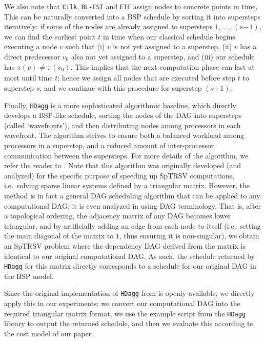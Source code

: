 \documentclass[sigconf,nonacm]{acmart}
\begin{document}
We also note that \texttt{Cilk}, \texttt{BL-EST} and \texttt{ETF} assign nodes to concrete points in time. This can be naturally converted into a BSP schedule by sorting it into supersteps iteratively: if some of the nodes are already assigned to supersteps $1$, ..., $(s_{\!}-_{\!}1)$, we can find the earliest point $t$ in time when our classical schedule begins executing a node $v$ such that (i) $v$ is not yet assigned to a superstep, (ii) $v$ has a direct predecessor $v_0$ also not yet assigned to a superstep, and (iii) our schedule has $\pi(v) _{\!} \neq _{\!} \pi(v_0)$. This implies that the next computation phase can last at most until time $t$; hence we assign all nodes that are executed before step $t$ to superstep $s$, and we continue with this procedure for superstep $(s_{\!}+_{\!}1)$.

Finally, \texttt{HDagg} is a more sophisticated algorithmic baseline, which directly develops a BSP-like schedule, sorting the nodes of the DAG into supersteps (called `wavefronts'), and then distributing nodes among processors in each wavefront. The algorithm strives to ensure both a balanced workload among processors in a superstep, and a reduced amount of inter-processor communication between the supersteps. For more details of the algorithm, we refer the reader to \cite{hdagg}. Note that this algorithm was originally developed (and analyzed) for the specific purpose of speeding up SpTRSV computations, i.e.\ solving sparse linear systems defined by a triangular matrix. However, the method is in fact a general DAG scheduling algorithm that can be applied to any computational DAG; it is even analyzed in \cite{hdagg} using DAG terminology. That is, after a topological ordering, the adjacency matrix of any DAG becomes lower triangular, and by artificially adding an edge from each node to itself (i.e.\ setting the main diagonal of the matrix to $1$, thus ensuring it is non-singular), we obtain an SpTRSV problem where the dependency DAG derived from the matrix is identical to our original computational DAG. As such, the schedule returned by \texttt{HDagg} for this matrix directly corresponds to a schedule for our original DAG in the BSP model.

Since the original implementation of \texttt{HDagg} from \cite{hdagg} is openly available, we directly apply this in our experiments: we convert our computational DAG into the required triangular matrix format, we use the example script from the \texttt{HDagg} library to output the returned schedule, and then we evaluate this according to the cost model of our paper.
\end{document}
